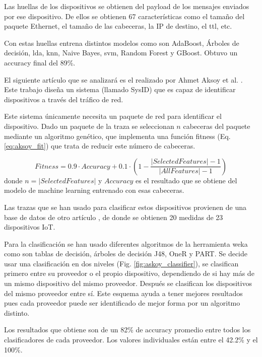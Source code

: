Las huellas de los dispositivos se obtienen del payload de los mensajes enviados por ese dispositivo. De ellos se obtienen 67 características como el tamaño del paquete Ethernet, el tamaño de las cabeceras, la IP de destino, el \acrfull{ttl}, etc.

Con estas huellas entrena distintos modelos como son AdaBoost, Árboles de decisión, \acrfull{lda}, \acrshort{knn}, Naive Bayes, \acrshort{svm}, Random Forest y GBoost. Obtuvo un accuracy final del 89\%.

El siguiente artículo que se analizará es el realizado por Ahmet Aksoy et al. \cite{aksoy2019automated}. Este trabajo diseña un sistema (llamado SysID) que es capaz de identificar dispositivos a través del tráfico de red. 

Este sistema únicamente necesita un paquete de red para identificar el dispositivo. Dado un paquete de la traza se seleccionan $n$ cabeceras del paquete mediante un algoritmo genético, que implementa una función fitness (Eq. \ref{eq:aksoy_fit}) que trata de reducir este número de cabeceras. 

\begin{equation}
    Fitness = 0.9 \cdot Accuracy + 0.1 \cdot \left( 1 - \frac{\lvert SelectedFeatures \rvert - 1}{\lvert AllFeatures \rvert - 1} \right)
    \label{eq:aksoy_fit}
\end{equation}
donde $n = \lvert SelectedFeatures \rvert$ y $Accuracy$ es el resultado que se obtiene del modelo de machine learning entrenado con esas cabeceras.

Las trazas que se han usado para clasificar estos dispositivos provienen de una base de datos de otro artículo \cite{miettinen2017iot}, de donde se obtienen 20 medidas de 23 dispositivos IoT.

Para la clasificación se han usado diferentes algoritmos de la herramienta \acrfull{weka} \cite{hall2009weka} como son tablas de decisión, árboles de decisión J48, OneR y PART. Se decide usar una clasificación en dos niveles (Fig. \ref{fig:askoy_classifier}), se clasifican primero entre su proveedor o el propio dispositivo, dependiendo de si hay más de un mismo dispositivo del mismo proveedor. Después se clasifican los dispositivos del mismo proveedor entre sí. Este esquema ayuda a tener mejores resultados pues cada proveedor puede ser identificado de mejor forma por un algoritmo distinto.

Los resultados que obtiene son de un 82\% de accuracy promedio entre todos los clasificadores de cada proveedor. Los valores individuales están entre el 42.2\% y el 100\%.

